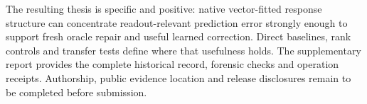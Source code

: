 \documentclass[11pt]{article}
\begin{document}
The resulting thesis is specific and positive: native vector-fitted response structure can concentrate readout-relevant prediction error strongly enough to support fresh oracle repair and useful learned correction. Direct baselines, rank controls and transfer tests define where that usefulness holds. The supplementary report provides the complete historical record, forensic checks and operation receipts. Authorship, public evidence location and release disclosures remain to be completed before submission.

\clearpage
\small


\end{document}

